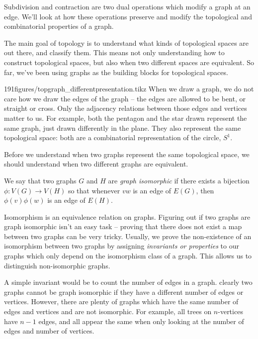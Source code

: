 \begin{elevator}
Subdivision and contraction are two dual operations which  modify a graph at an edge.
We'll look at how these operations preserve and modify the topological and combinatorial properties of a graph.
\end{elevator}
\label{sec:graph:Minors}
The main goal of topology is to understand what kinds of topological spaces are out there, and classify them.
This means not only understanding how to construct topological spaces, but also when two different spaces are equivalent.
So far, we've been using graphs as the building blocks for topological spaces.
\begin{examplefigureenv}{191figures/topgraph_differentpresentation.tikz}
	When we draw a graph,  we do not care how we draw the edges of the graph --  the edges are allowed to be bent, or straight or cross. Only the adjacency relations between those edges and vertices matter to us.
	For example, both the pentagon and the star drawn represent the same graph, just drawn differently in the plane.
	They also represent the same topological space: both are a combinatorial representation of the circle, $S^1$.
	\end{examplefigureenv}
Before we understand when two graphs represent the same topological space, we should understand when two different graphs are equivalent.
\begin{definition}
	We say that two graphs $G$ and $H$ are \emph{graph isomorphic} if there exists a bijection $\phi: V(G)\to V(H)$ so that whenever $vw$ is an edge of $E(G)$, then $\phi(v)\phi(w)$ is an edge of $E(H)$. 
	\label{def:graphiso}
\end{definition}

Isomorphism is an equivalence relation on graphs. 
Figuring out if two graphs are graph isomorphic isn't an easy task -- proving that there does not exist a map between two graphs can be very tricky. 
Usually, we prove the non-existence of an isomorphism between two graphs by assigning \emph{invariants or properties} to our graphs which only depend on the isomorphism class of a graph. 
This allows us to distinguish non-isomorphic graphs. 

A simple invariant would be to count the number of edges in a graph.  clearly two graphs cannot be graph isomorphic if they have a different number of edges or vertices.
However, there are plenty of graphs which have the same number of edges and vertices and are not isomorphic. 
For example, all trees on $n$-vertices  have $n-1$ edges, and all appear the same when only looking at the number of edges and number of vertices. 

